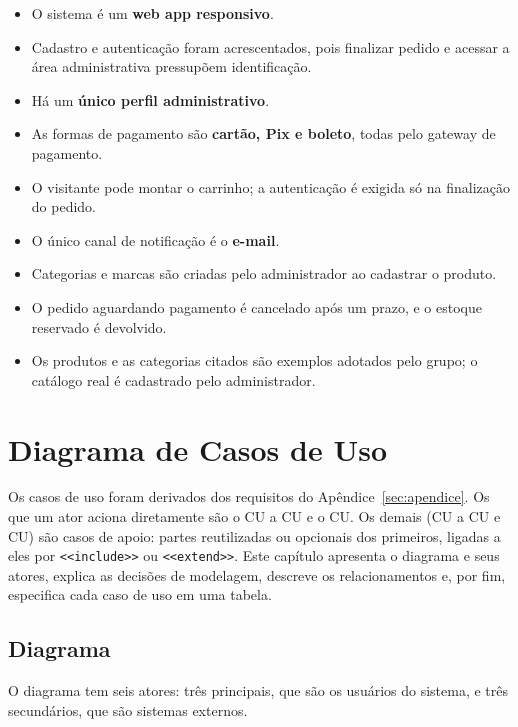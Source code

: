 \documentclass[12pt,a4paper]{article}
\providecommand{\tightlist}{%
  \setlength{\itemsep}{0pt}\setlength{\parskip}{0pt}}
\begin{document}
\begin{itemize}
\tightlist
\item O sistema é um \textbf{web app responsivo}.
\item Cadastro e autenticação foram acrescentados, pois finalizar pedido e
  acessar a área administrativa pressupõem identificação.
\item Há um \textbf{único perfil administrativo}.
\item As formas de pagamento são \textbf{cartão, Pix e boleto}, todas pelo
  gateway de pagamento.
\item O visitante pode montar o carrinho; a autenticação é exigida só na
  finalização do pedido.
\item O único canal de notificação é o \textbf{e-mail}.
\item Categorias e marcas são criadas pelo administrador ao cadastrar o produto.
\item O pedido aguardando pagamento é cancelado após um prazo, e o estoque reservado é devolvido.
\item Os produtos e as categorias citados são exemplos adotados pelo grupo; o
  catálogo real é cadastrado pelo administrador.
\end{itemize}

\section{Diagrama de Casos de Uso}\label{sec:uc}

Os casos de uso foram derivados dos requisitos do Apêndice~\ref{sec:apendice}. Os que um ator aciona diretamente são o CU a CU e o CU. Os demais (CU a CU e CU) são casos de apoio: partes reutilizadas ou opcionais dos primeiros, ligadas a eles por \texttt{<<include>>} ou \texttt{<<extend>>}. Este capítulo apresenta o diagrama e seus atores, explica as decisões de modelagem, descreve os relacionamentos e, por fim, especifica cada caso de uso em uma tabela.

\subsection{Diagrama}

O diagrama tem seis atores: três principais, que são os usuários do sistema, e três secundários, que são sistemas externos.
\end{document}

